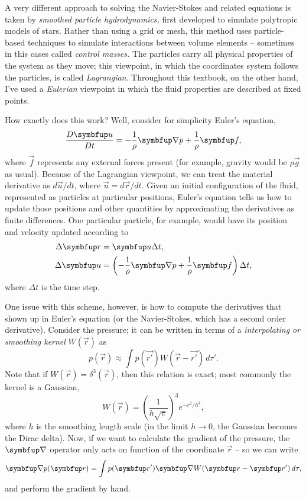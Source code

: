 A very different approach to solving the Navier-Stokes and related equations is taken by \emph{smoothed particle hydrodynamics,} first developed to simulate polytropic models of stars. Rather than using a grid or mesh, this method uses particle-based techniques to simulate interactions between volume elements -- sometimes in this cases called \emph{control masses.}  The particles carry all physical properties of the system as they move; this viewpoint, in which the coordinates system follows the particles, is called \emph{Lagrangian}.  Throughout this textbook, on the other hand, I've used a \emph{Eulerian} viewpoint in which the fluid properties are described at fixed points.

How exactly does this work?  Well, consider for simplicity Euler's equation,
\[
\frac{D\vec{u}}{Dt} = -\frac{1}{\rho} \grad p + \frac{1}{\rho} \vec{f},
\]
where $\vec{f}$ represents any external forces present (for example, gravity would be $\rho \vec{g}$ as usual).  Because of the Lagrangian viewpoint, we can treat the material derivative as $d\vec{u}/dt$, where $\vec{u} = d\vec{r}/dt$.  Given an initial configuration of the fluid, represented as particles at particular positions, Euler's equation tells us how to update those positions and other quantities by approximating the derivatives as finite differences.  One particular particle, for example, would have its position and velocity updated according to
\begin{align*}
\Delta \vec{r} &= \vec{u} \Delta t, \\
\Delta \vec{u} &= \left( -\frac{1}{\rho} \grad p + \frac{1}{\rho} \vec{f} \right) \Delta t,
\end{align*}
where $\Delta t$ is the time step.

One issue with this scheme, however, is how to compute the derivatives that shown up in Euler's equation (or the Navier-Stokes, which has a second order derivative).  Consider the pressure; it can be written in terms of a \emph{interpolating or smoothing kernel} $W(\vec{r})$ as
\[
p(\vec{r}) \approx \int p(\vec{r'}) W(\vec{r} - \vec{r'}) \, d\tau'.
\]
Note that if $W(\vec{r}) = \delta^3(\vec{r})$, then this relation is exact; most commonly the kernel is a Gaussian,
\[
W(\vec{r}) = \left( \frac{1}{h \sqrt{\pi} } \right)^3 e^{-r^2/h^2},
\]
where $h$ is the smoothing length scale (in the limit $h\to 0$, the Gaussian becomes the Dirac delta).  Now, if we want to calculate the gradient of the pressure, the $\grad$ operator only acts on function of the coordinate $\vec{r}$ -- so we can write
\[
\grad p(\vec{r}) = \int p(\vec{r'}) \grad W(\vec{r} - \vec{r'}) \, d\tau,
\]
and perform the gradient by hand.  

